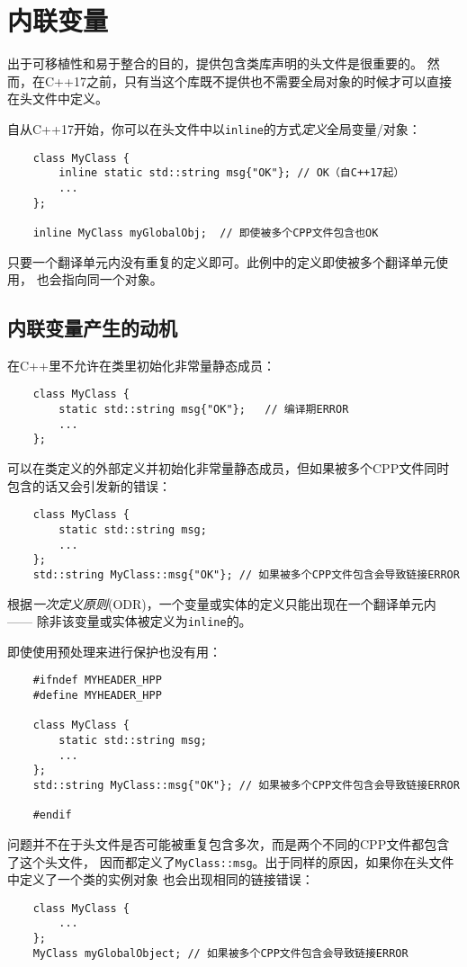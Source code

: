 \section{内联变量}\label{ch3}
出于可移植性和易于整合的目的，提供包含类库声明的头文件是很重要的。
然而，在C++17之前，只有当这个库既不提供也不需要全局对象的时候才可以直接在头文件中定义。

自从C++17开始，你可以在头文件中以\texttt{inline}的方式\emph{定义}全局变量/对象：
\begin{lstlisting}
    class MyClass {
        inline static std::string msg{"OK"}; // OK（自C++17起）
        ...
    };

    inline MyClass myGlobalObj;  // 即使被多个CPP文件包含也OK
\end{lstlisting}
只要一个翻译单元内没有重复的定义即可。此例中的定义即使被多个翻译单元使用，
也会指向同一个对象。

\subsection{内联变量产生的动机}
在C++里不允许在类里初始化非常量静态成员：
\begin{lstlisting}
    class MyClass {
        static std::string msg{"OK"};   // 编译期ERROR
        ...
    };
\end{lstlisting}
可以在类定义的外部定义并初始化非常量静态成员，但如果被多个CPP文件同时包含的话又会引发新的错误：
\begin{lstlisting}
    class MyClass {
        static std::string msg;
        ...
    };
    std::string MyClass::msg{"OK"}; // 如果被多个CPP文件包含会导致链接ERROR
\end{lstlisting}
根据\emph{一次定义原则}(ODR)，一个变量或实体的定义只能出现在一个翻译单元内——
除非该变量或实体被定义为\texttt{inline}的。

即使使用预处理来进行保护也没有用：
\begin{lstlisting}
    #ifndef MYHEADER_HPP
    #define MYHEADER_HPP

    class MyClass {
        static std::string msg;
        ...
    };
    std::string MyClass::msg{"OK"}; // 如果被多个CPP文件包含会导致链接ERROR

    #endif
\end{lstlisting}
问题并不在于头文件是否可能被重复包含多次，而是两个不同的CPP文件都包含了这个头文件，
因而都定义了\texttt{MyClass::msg}。出于同样的原因，如果你在头文件中定义了一个类的实例对象
也会出现相同的链接错误：
\begin{lstlisting}
    class MyClass {
        ...
    };
    MyClass myGlobalObject; // 如果被多个CPP文件包含会导致链接ERROR
\end{lstlisting}

